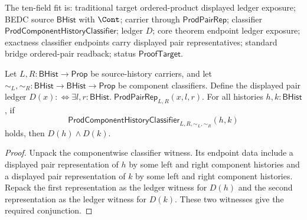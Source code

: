 \begin{theorem}
\label{thm:prod-component-history-classifier-displayed-ledger-endpoints}
The ten-field fit is: traditional target ordered-product displayed ledger
exposure; BEDC source $\mathsf{BHist}$ with $\Cont$; carrier through
$\mathsf{ProdPairRep}$; classifier
$\mathsf{ProdComponentHistoryClassifier}$; ledger $D$; core theorem endpoint
ledger exposure; exactness classifier endpoints carry displayed pair
representatives; standard bridge ordered-pair readback; status
$\mathsf{ProofTarget}$.

Let $L,R:\mathsf{BHist}\to\mathsf{Prop}$ be source-history carriers, and let
$\sim_L,\sim_R:\mathsf{BHist}\to\mathsf{BHist}\to\mathsf{Prop}$ be component
classifiers. Define the displayed pair ledger
$D(x):\Longleftrightarrow
\exists l,r:\mathsf{BHist}.\;\mathsf{ProdPairRep}_{L,R}(x,l,r)$.
For all histories $h,k:\mathsf{BHist}$, if
$$
\mathsf{ProdComponentHistoryClassifier}_{L,R,\sim_L,\sim_R}(h,k)
$$
holds, then $D(h)\land D(k)$.
\end{theorem}
\begin{proof}
Unpack the componentwise classifier witness. Its endpoint data include a
displayed pair representation of $h$ by some left and right component histories
and a displayed pair representation of $k$ by some left and right component
histories. Repack the first representation as the ledger witness for $D(h)$ and
the second representation as the ledger witness for $D(k)$. These two witnesses
give the required conjunction.
\end{proof}

